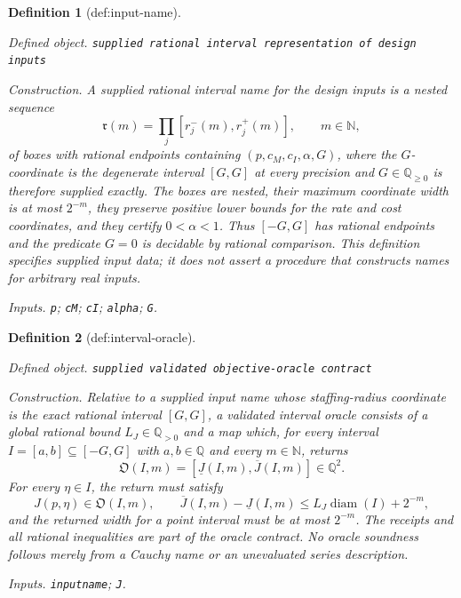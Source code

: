 \documentclass{article}
\newtheorem{definition}{Definition}
\begin{document}
\begin{definition}[def:input-name]\label{def:input-name}
\par\smallskip\noindent\emph{Defined object.} \texttt{supplied rational interval representation of design inputs}
\par\smallskip\noindent\emph{Construction.} A supplied rational interval name for the design inputs is a nested sequence
\[
 \mathfrak r(m)=\prod_j[r_j^-(m),r_j^+(m)],\qquad m\in\mathbb N,
\]
of boxes with rational endpoints containing \((p,c_M,c_I,\alpha,G)\), where the \(G\)-coordinate is the degenerate interval \([G,G]\) at every precision and \(G\in\mathbb Q_{\geq0}\) is therefore supplied exactly.  The boxes are nested, their maximum coordinate width is at most \(2^{-m}\), they preserve positive lower bounds for the rate and cost coordinates, and they certify \(0<\alpha<1\).  Thus \([-G,G]\) has rational endpoints and the predicate \(G=0\) is decidable by rational comparison.  This definition specifies supplied input data; it does not assert a procedure that constructs names for arbitrary real inputs.
\par\smallskip\noindent\emph{Inputs.} \texttt{p}; \texttt{cM}; \texttt{cI}; \texttt{alpha}; \texttt{G}.
\end{definition}

\begin{definition}[def:interval-oracle]\label{def:interval-oracle}
\par\smallskip\noindent\emph{Defined object.} \texttt{supplied validated objective-\allowbreak{}oracle contract}
\par\smallskip\noindent\emph{Construction.} Relative to a supplied input name whose staffing-radius coordinate is the exact rational interval \([G,G]\), a validated interval oracle consists of a global rational bound \(L_J\in\mathbb Q_{>0}\) and a map which, for every interval \(I=[a,b]\subseteq[-G,G]\) with \(a,b\in\mathbb Q\) and every \(m\in\mathbb N\), returns
\[
 \mathfrak O(I,m)=[\underline J(I,m),\overline J(I,m)]\in\mathbb Q^2.
\]
For every \(\eta\in I\), the return must satisfy
\[
 J(p,\eta)\in\mathfrak O(I,m),
 \qquad
 \overline J(I,m)-\underline J(I,m)
 \leq L_J\operatorname{diam}(I)+2^{-m},
\]
and the returned width for a point interval must be at most \(2^{-m}\).  The receipts and all rational inequalities are part of the oracle contract.  No oracle soundness follows merely from a Cauchy name or an unevaluated series description.
\par\smallskip\noindent\emph{Inputs.} \texttt{inputname}; \texttt{J}.
\end{definition}
\end{document}
